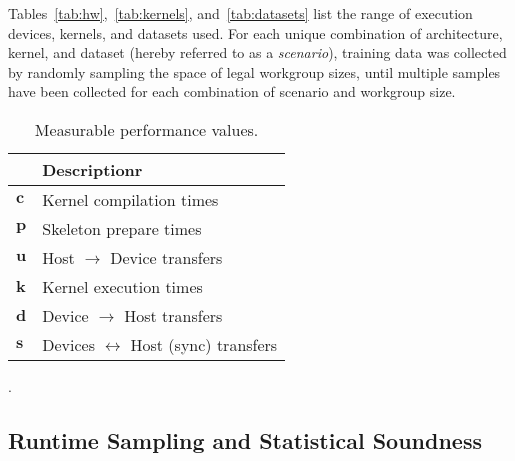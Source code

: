 Tables~\ref{tab:hw},~\ref{tab:kernels}, and~\ref{tab:datasets} list
the range of execution devices, kernels, and datasets used. For each
unique combination of architecture, kernel, and dataset (hereby
referred to as a \emph{scenario}), training data was collected by
randomly sampling the space of legal workgroup sizes, until multiple
samples have been collected for each combination of scenario and
workgroup size.

\begin{table}
\footnotesize
\centering
\begin{tabular}{| l | l |}
  \hline
  & \textbf{Descriptionr}\\
  \hline
  $\bm{c}$ & Kernel compilation times \\
  $\bm{p}$ & Skeleton prepare times \\
  $\bm{u}$ & Host $\rightarrow$ Device transfers \\
  $\bm{k}$ & Kernel execution times \\
  $\bm{d}$ & Device $\rightarrow$ Host transfers \\
  $\bm{s}$ & Devices $\leftrightarrow$ Host (sync) transfers \\
  \hline
\end{tabular}
\caption{Measurable performance values.}
\label{tab:metric}
\end{table}


.

\subsection{Runtime Sampling and Statistical Soundness}



